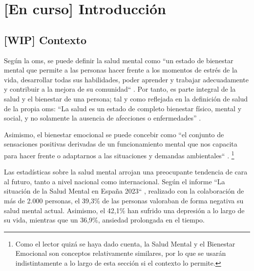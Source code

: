 \chapter{[En curso] Introducción}
\label{chapter:introduccion}



\section{[WIP] Contexto}
    Según la \gls{oms}, se puede definir la salud mental como ``un estado de bienestar mental que permite a las personas hacer frente a los momentos de estrés de la vida, desarrollar todas sus habilidades, poder aprender y trabajar adecuadamente y contribuir a la mejora de su comunidad`` \cite{oms_salud_2022}. Por tanto, es parte integral de la salud y el bienestar de una persona; tal y como reflejada en la definición de salud de la propia \gls{oms}: “La salud es un estado de completo bienestar físico, mental y social, y no solamente la ausencia de afecciones o enfermedades” \cite{feafes_galicia_que_nodate}.

    Asimismo, el bienestar emocional se puede concebir como ``el conjunto de sensaciones positivas derivadas de un funcionamiento mental que nos capacita para hacer frente o adaptarnos a las situaciones y demandas ambientales`` \cite{clinic_barcelona_que_nodate}. \footnote{Como el lector quizá se haya dado cuenta, la Salud Mental y el Bienestar Emocional son conceptos relativamente similares, por lo que se usarán indistintamente a lo largo de esta sección si el contexto lo permite.}

    Las estadísticas sobre la salud mental arrojan una preocupante tendencia de cara al futuro, tanto a nivel nacional como internacional. Según el informe ``La situación de la Salud Mental en España 2023`` \cite{comunicacion_cuatro_2023}, realizado con la colaboración de más de 2.000 personas, el 39,3\% de las personas valoraban de forma negativa su salud mental actual. Asimismo, el 42,1\% han sufrido una depresión a lo largo de su vida, mientras que un 36,9\%, ansiedad prolongada en el tiempo. 
    

